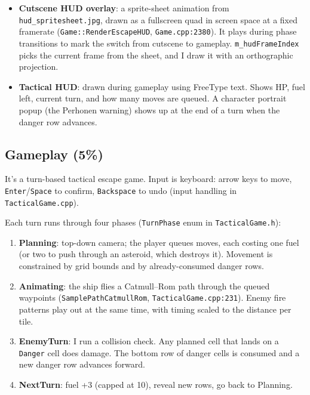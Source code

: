 \documentclass[11pt,a4paper]{article}
\begin{document}
\begin{itemize}
  \item \textbf{Cutscene HUD overlay}: a sprite-sheet animation from
        \texttt{hud\_spritesheet.jpg}, drawn as a fullscreen quad in screen
        space at a fixed framerate (\texttt{Game::RenderEscapeHUD},
        \texttt{Game.cpp:2380}). It plays during phase transitions to mark
        the switch from cutscene to gameplay. \texttt{m\_hudFrameIndex}
        picks the current frame from the sheet, and I draw it with an
        orthographic projection.
  \item \textbf{Tactical HUD}: drawn during gameplay using FreeType text.
        Shows HP, fuel left, current turn, and how many moves are queued.
        A character portrait popup (the Perhonen warning) shows up at the
        end of a turn when the danger row advances.
\end{itemize}


\subsection{Gameplay (5\%)}

It's a turn-based tactical escape game. Input is keyboard: arrow keys to
move, \texttt{Enter}/\texttt{Space} to confirm, \texttt{Backspace} to undo
(input handling in \texttt{TacticalGame.cpp}).

Each turn runs through four phases (\texttt{TurnPhase} enum in
\texttt{TacticalGame.h}):

\begin{enumerate}
  \item \textbf{Planning}: top-down camera; the player queues moves, each
        costing one fuel (or two to push through an asteroid, which destroys
        it). Movement is constrained by grid bounds and by already-consumed
        danger rows.
  \item \textbf{Animating}: the ship flies a Catmull--Rom path through the
        queued waypoints (\texttt{SamplePathCatmullRom},
        \texttt{TacticalGame.cpp:231}). Enemy fire patterns play out at the
        same time, with timing scaled to the distance per tile.
  \item \textbf{EnemyTurn}: I run a collision check. Any planned cell that
        lands on a \texttt{Danger} cell does damage. The bottom row of
        danger cells is consumed and a new danger row advances forward.
  \item \textbf{NextTurn}: fuel +3 (capped at 10), reveal new rows, go back
        to Planning.
\end{enumerate}
\end{document}
